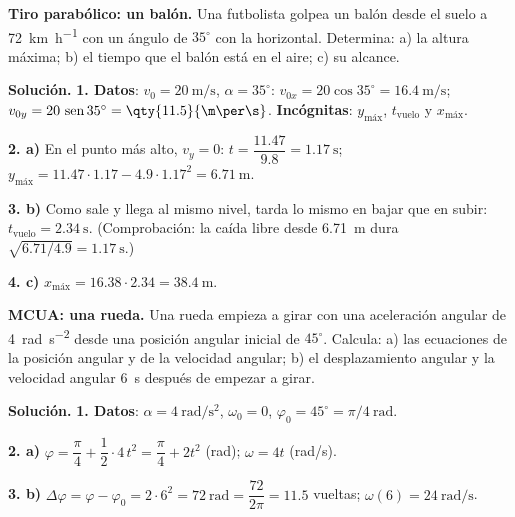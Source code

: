 \begin{example}
    \textbf{Tiro parabólico: un balón.} Una futbolista golpea un balón desde el suelo a \qty{72}{\km\per\hour} con un ángulo de
    \(35^\circ\) con la horizontal. Determina: a) la altura máxima; b) el tiempo que el balón está en el aire; c) su alcance.

    \textbf{Solución.} \textbf{1. Datos}: \(v_0 = \qty{20}{\m\per\s}\), \(\alpha = 35^\circ\): \(v_{0x} = 20\cos 35^\circ =
    \qty{16.4}{\m\per\s}\); \(v_{0y} = 20\,\sen 35^\circ = \qty{11.5}{\m\per\s}\). \textbf{Incógnitas}: \(y_{\text{máx}}\),
    \(t_{\text{vuelo}}\) y \(x_{\text{máx}}\).

    \textbf{2. a)} En el punto más alto, \(v_y = 0\): \(t = \dfrac{\num{11.47}}{\num{9.8}} = \qty{1.17}{\s}\);
    \(y_{\text{máx}} = \num{11.47} \cdot \num{1.17} - \num{4.9} \cdot \num{1.17}^2 = \qty{6.71}{\m}\).

    \textbf{3. b)} Como sale y llega al mismo nivel, tarda lo mismo en bajar que en subir: \(t_{\text{vuelo}} = \qty{2.34}{\s}\).
    (Comprobación: la caída libre desde \qty{6.71}{\m} dura \(\sqrt{\num{6.71}/\num{4.9}} = \qty{1.17}{\s}\).)

    \textbf{4. c)} \(x_{\text{máx}} = \num{16.38} \cdot \num{2.34} = \qty{38.4}{\m}\).
\end{example}

\begin{example}
    \textbf{MCUA: una rueda.} Una rueda empieza a girar con una aceleración angular de \qty{4}{\radian\per\s\squared} desde una
    posición angular inicial de \(45^\circ\). Calcula: a) las ecuaciones de la posición angular y de la velocidad angular; b) el
    desplazamiento angular y la velocidad angular \qty{6}{\s} después de empezar a girar.

    \textbf{Solución.} \textbf{1. Datos}: \(\alpha = \qty{4}{\radian\per\s\squared}\), \(\omega_0 = 0\), \(\varphi_0 = 45^\circ =
    \pi/4~\unit{\radian}\).

    \textbf{2. a)} \(\varphi = \dfrac{\pi}{4} + \dfrac{1}{2} \cdot 4\,t^2 = \dfrac{\pi}{4} + 2t^2\) (rad); \(\omega = 4t\) (rad/s).

    \textbf{3. b)} \(\Delta\varphi = \varphi - \varphi_0 = 2 \cdot 6^2 = \qty{72}{\radian} = \dfrac{72}{2\pi} = \num{11.5}\) vueltas;
    \(\omega(6) = \qty{24}{\radian\per\s}\).
\end{example}

